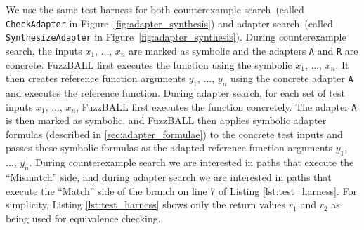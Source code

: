 We use the same test harness for both counterexample search~(called
		\texttt{CheckAdapter} in Figure~\ref{fig:adapter_synthesis}) and
adapter search~(called \texttt{SynthesizeAdapter} in
		Figure~\ref{fig:adapter_synthesis}). 
%
During counterexample search, the inputs $x_1$, ..., $x_n$ are marked as
symbolic and the adapters {\tt A} and {\tt R} are concrete.
%
FuzzBALL first executes the function using the symbolic $x_1$, ..., $x_n$.
%
It then creates reference function arguments $y_1$, ..., $y_n$ using the
concrete adapter \texttt{A} and executes the reference function.
%
During adapter search, for each set of test inputs $x_1$, ..., $x_n$, FuzzBALL first executes the function concretely.
%
The adapter \texttt{A} is then marked as symbolic, and FuzzBALL then applies symbolic adapter formulas (described in \ref{sec:adapter_formulae}) to the concrete test inputs and passes these symbolic formulas as the adapted reference function arguments $y_1$, ..., $y_n$.
%
During counterexample search we are interested in paths that execute the ``Mismatch'' side, and during adapter search we are interested in paths that execute the ``Match'' side of the branch on line 7 of Listing \ref{lst:test_harness}.
%
For simplicity, Listing \ref{lst:test_harness} shows only the return values $r_1$ and $r_2$ as being used for equivalence checking.
%
%
